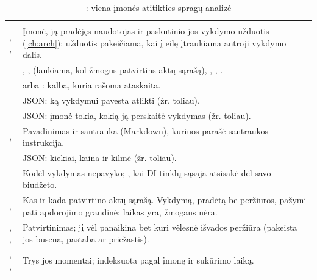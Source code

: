 \begin{xltabular}{\textwidth}{@{}L{38mm}Y@{}}
\caption{: viena įmonės atitikties spragų analizė}\label{tab:data:re}\\
\toprule
{} &  \\
\midrule
\endfirsthead
\toprule
{} &  \\
\midrule
\endhead
\bottomrule
\endlastfoot
{}, ,  & Įmonė, ją pradėjęs naudotojas ir paskutinio jos vykdymo užduotis (\cref{ch:arch}); užduotis pakeičiama, kai į eilę įtraukiama antroji vykdymo dalis. \\
 & , ,  (laukiama, kol žmogus patvirtins aktų sąrašą), , , . \\
 &  arba : kalba, kuria rašoma ataskaita. \\
 & JSON: ką vykdymui pavesta atlikti (žr. toliau). \\
 & JSON: įmonė tokia, kokią ją perskaitė vykdymas (žr. toliau). \\
,  & Pavadinimas ir santrauka (Markdown), kuriuos parašė santraukos instrukcija. \\
 & JSON: kiekiai, kaina ir kilmė (žr. toliau). \\
 & Kodėl vykdymas nepavyko; , kai DI tinklų sąsaja atsisakė dėl savo biudžeto. \\
,  & Kas ir kada patvirtino aktų sąrašą. Vykdymą, pradėtą be peržiūros, pažymi pati apdorojimo grandinė: laikas yra, žmogaus nėra. \\
, ,  & Patvirtinimas; jį vėl panaikina bet kuri vėlesnė išvados peržiūra (pakeista jos būsena, pastaba ar priežastis). \\
, ,  & Trys jos momentai; indeksuota pagal įmonę ir sukūrimo laiką. \\
\end{xltabular}

